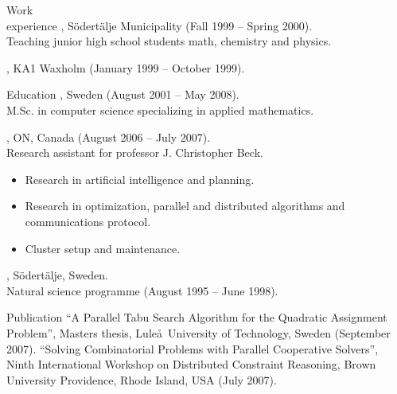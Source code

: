 \documentclass{../../cls/cv}
\begin{document}
\begin{category}{Work \\experience}
, S\"odert\"alje Municipality (Fall 1999 --
Spring 2000). \\
Teaching junior high school students math, chemistry and physics.

, KA1 Waxholm (January 1999 -- October 1999).
\end{category}

\begin{category}{Education}
, Sweden (August 2001 -- May 2008).\\
M.Sc. in computer science specializing in applied mathematics.

, ON, Canada (August 2006 -- July 2007). \\
Research assistant for professor J. Christopher Beck.
\begin{itemize}
   \item Research in artificial intelligence and planning.
   \item Research in optimization, parallel and distributed algorithms and communications protocol.
   \item Cluster setup and maintenance.
\end{itemize}

, S\"odert\"alje, Sweden.\\
Natural science programme (August 1995 -- June 1998).
\end{category}

\begin{category}{Publication}
\citembullet ``A Parallel Tabu Search Algorithm for the Quadratic Assignment Problem'', Masters thesis, Lule\aa\ University of Technology, Sweden (September 2007).
\citembullet ``Solving Combinatorial Problems with Parallel Cooperative Solvers'', Ninth International
Workshop on Distributed Constraint Reasoning, Brown University Providence, Rhode Island, USA (July 2007).
\end{category}
\end{document}
